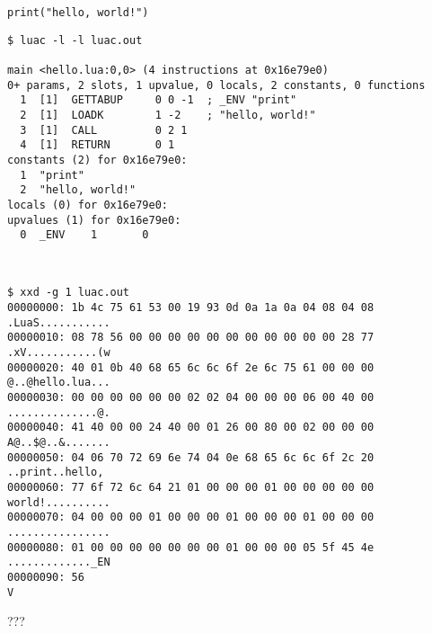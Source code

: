 \begin{frame}[fragile]
	\frametitlesubs
	\hspace{-.5\zw}
	\begin{minipage}[t]{.34\textwidth}
		\bgroup\footnotesize
		\begin{lstlisting}[numbers=none,language={[5.3]lua}]
print("hello, world!")
		\end{lstlisting}
		\tiny
		\begin{lstlisting}[numbers=none]
 $ luac -l -l luac.out

main <hello.lua:0,0> (4 instructions at 0x16e79e0)
0+ params, 2 slots, 1 upvalue, 0 locals, 2 constants, 0 functions
  1  [1]  GETTABUP     0 0 -1  ; _ENV "print"
  2  [1]  LOADK        1 -2    ; "hello, world!"
  3  [1]  CALL         0 2 1
  4  [1]  RETURN       0 1
constants (2) for 0x16e79e0:
  1  "print"
  2  "hello, world!"
locals (0) for 0x16e79e0:
upvalues (1) for 0x16e79e0:
  0  _ENV    1       0
		\end{lstlisting}
		\egroup
	\end{minipage}
	\begin{minipage}{.01\textwidth}
		\ 
	\end{minipage}
	\begin{minipage}[t]{.64\textwidth}
		\pause
		\bgroup\tiny
		\begin{lstlisting}[numbers=none]
$ xxd -g 1 luac.out
00000000: 1b 4c 75 61 53 00 19 93 0d 0a 1a 0a 04 08 04 08  .LuaS...........
00000010: 08 78 56 00 00 00 00 00 00 00 00 00 00 00 28 77  .xV...........(w
00000020: 40 01 0b 40 68 65 6c 6c 6f 2e 6c 75 61 00 00 00  @..@hello.lua...
00000030: 00 00 00 00 00 00 02 02 04 00 00 00 06 00 40 00  ..............@.
00000040: 41 40 00 00 24 40 00 01 26 00 80 00 02 00 00 00  A@..$@..&.......
00000050: 04 06 70 72 69 6e 74 04 0e 68 65 6c 6c 6f 2c 20  ..print..hello,
00000060: 77 6f 72 6c 64 21 01 00 00 00 01 00 00 00 00 00  world!..........
00000070: 04 00 00 00 01 00 00 00 01 00 00 00 01 00 00 00  ................
00000080: 01 00 00 00 00 00 00 00 01 00 00 00 05 5f 45 4e  ............._EN
00000090: 56                                                                  V
		\end{lstlisting}
		\egroup\normalfont
		\pause
		\begin{center}
			\vspace{1\zw}
			\LARGE
			\alert{???}
		\end{center}
	\end{minipage}
\end{frame}
